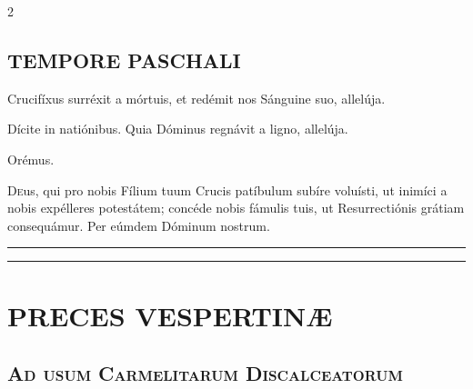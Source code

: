 \documentclass[9pt,twoside]{extarticle}
\begin{document}
\begin{multicols}{2}
\subsection*{\center \textsc{TEMPORE PASCHALI}}
\begin{tightlist}{}
\item {}
\item {} Crucifíxus surréxit a mórtuis, et redémit nos Sánguine suo, allelúja.
\item {} Dícite in natiónibus.  Quia Dóminus regnávit a ligno, allelúja.
\item Orémus. \hfill {}
\end{tightlist}
\lettrine{D}eus, qui pro nobis Fílium tuum Crucis patíbulum subíre voluísti, ut inimíci a nobis expélleres potestátem; concéde nobis fámulis tuis, ut Resurrectiónis grátiam consequámur. Per eúmdem Dóminum nostrum.

\begin{center}\textcolor{red}{\rule{\linewidth}{0.5pt}} \end{center}

\end{multicols}
\vfill
\begin{center}
\textcolor{red}{\rule{0.8\textwidth}{0.5pt}}
\end{center}

\cleardoublepage

\section*{\center \textsc{PRECES VESPERTINÆ}}
\subsection*{\center \textsc{Ad usum Carmelitarum Discalceatorum}}
\subsubsection*{\center {}}
\end{document}
